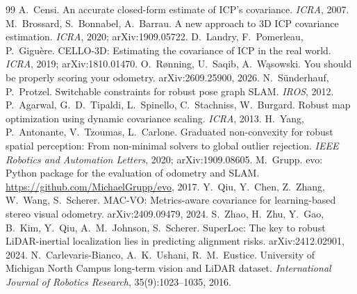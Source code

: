 \documentclass[11pt,a4paper]{article}
\begin{document}
\begin{thebibliography}{99}
 A.~Censi. An accurate closed-form estimate of ICP's covariance. \emph{ICRA}, 2007.
 M.~Brossard, S.~Bonnabel, A.~Barrau. A new approach to 3D ICP covariance estimation.
\emph{ICRA}, 2020; arXiv:1909.05722.
 D.~Landry, F.~Pomerleau, P.~Gigu\`ere. CELLO-3D: Estimating the covariance of ICP in the real
world. \emph{ICRA}, 2019; arXiv:1810.01470.
 O.~R{\o}nning, U.~Saqib, A.~W\k{a}sowski. You should be properly scoring your odometry.
arXiv:2609.25900, 2026.
 N.~S\"underhauf, P.~Protzel. Switchable constraints for robust pose graph SLAM. \emph{IROS},
2012.
 P.~Agarwal, G.~D.~Tipaldi, L.~Spinello, C.~Stachniss, W.~Burgard. Robust map optimization using
dynamic covariance scaling. \emph{ICRA}, 2013.
 H.~Yang, P.~Antonante, V.~Tzoumas, L.~Carlone. Graduated non-convexity for robust spatial perception:
From non-minimal solvers to global outlier rejection. \emph{IEEE Robotics and Automation Letters}, 2020;
arXiv:1909.08605.
 M.~Grupp. evo: Python package for the evaluation of odometry and SLAM.
\url{https://github.com/MichaelGrupp/evo}, 2017.
 Y.~Qiu, Y.~Chen, Z.~Zhang, W.~Wang, S.~Scherer. MAC-VO: Metrics-aware covariance for learning-based
stereo visual odometry. arXiv:2409.09479, 2024.
 S.~Zhao, H.~Zhu, Y.~Gao, B.~Kim, Y.~Qiu, A.~M.~Johnson, S.~Scherer. SuperLoc: The key to robust
LiDAR-inertial localization lies in predicting alignment risks. arXiv:2412.02901, 2024.
 N.~Carlevaris-Bianco, A.~K.~Ushani, R.~M.~Eustice. University of Michigan North Campus long-term
vision and LiDAR dataset. \emph{International Journal of Robotics Research}, 35(9):1023--1035, 2016.
\end{thebibliography}
\end{document}
